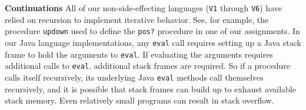 \begin{minipage}[t]{\sw}
\slidenumber
\LARGE
{\bf Continuations}\exx
All of our non-side-effecting languages (\verb'V1' through \verb'V6')
have relied on recursion to implement iterative behavior.
See, for example, the procedure \verb'updown'
used to define the \verb'pos?' procedure in one of our assignments.
In our Java language implementations,
any \verb'eval' call requires setting up a Java stack frame
to hold the arguments to \verb'eval'.
If evaluating the arguments requires additional calls to \verb'eval',
additional stack frames are required.
So if a procedure calls itself recursively,
its underlying Java \verb'eval' methods call themselves recursively, 
and it is possible that stack frames can build up
to exhaust available stack memory.
Even relatively small programs can result in stack overflow.\exx
\end{minipage}
